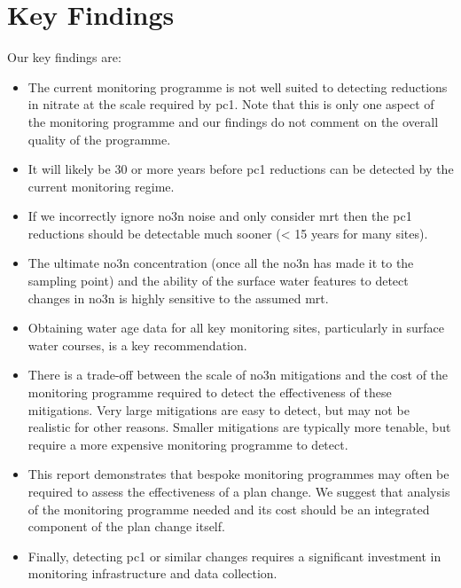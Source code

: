 \section*{Key Findings} \label{keyf} %

\begin{breakawaybox}[label={box:keyfind}, title=Key Findings]{}
    Our key findings are:
    \begin{itemize}
        \item The current monitoring programme is not well suited to detecting reductions in nitrate at the scale required by \gls{pc1}. Note that this is only one aspect of the monitoring programme and our findings do not comment on the overall quality of the programme.
        \item It will likely be 30 or more years before \gls{pc1} reductions can be detected by the current monitoring regime.
        \item If we incorrectly ignore \gls{no3n} noise and only consider \gls{mrt} then the \gls{pc1} reductions should be detectable much sooner (< 15 years for many sites).
        \item The ultimate \gls{no3n} concentration (once all the \gls{no3n} has made it to the sampling point) and the ability of the surface water features to detect changes in \gls{no3n} is highly sensitive to the assumed \gls{mrt}.
        \item Obtaining water age data for all key monitoring sites, particularly in surface water courses, is a key recommendation.
        \item There is a trade-off between the scale of \gls{no3n} mitigations and the cost of the monitoring programme required to detect the effectiveness of these mitigations. Very large mitigations are easy to detect, but may not be realistic for other reasons. Smaller mitigations are typically more tenable, but require a more expensive monitoring programme to detect.
        \item This report demonstrates that bespoke monitoring programmes may often be required to assess the effectiveness of a plan change. We suggest that analysis of the monitoring programme needed and its cost should be an integrated component of the plan change itself.
        \item Finally, detecting \gls{pc1} or similar changes requires a significant investment in monitoring infrastructure and data collection.
    \end{itemize}

\end{breakawaybox}

